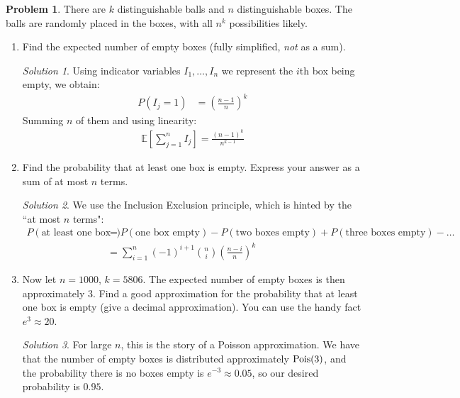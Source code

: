 \documentclass[11pt]{article}
\theoremstyle{definition}
\newtheorem{prob}[theo]{\color{Maroon} Problem}
\theoremstyle{remark}
\newtheorem*{soln}{\color{Maroon} Solution}
\newcommand{\E}[1]{\mathbb{E}\left[ #1 \right]}
\newcommand{\Pois}{\textnormal{Pois}}
\begin{document}
\pagebreak

\begin{prob} There are $k$ distinguishable balls and $n$ distinguishable boxes. The balls are randomly placed in the boxes, with all $n^k$ possibilities likely.

\begin{enumerate}[label = (\alph*)]
    \item Find the expected number of empty boxes (fully simplified, \textit{not} as a sum).
    
    \begin{soln} 
    Using indicator variables $I_1, \dots, I_n$ we represent the $i$th box being empty, we obtain:
    \begin{align*}
        P(I_j = 1) &= \left(\frac{n-1}{n}\right)^k
    \end{align*}
    Summing $n$ of them and using linearity:
    \begin{align*}
        \E{\sum_{j=1}^n I_j} = \frac{(n-1)^k}{n^{k-1}}
    \end{align*}
    \end{soln}
    
    \dotfill
    
    \item Find the probability that at least one box is empty. Express your answer as a sum of at most $n$ terms.
    
    \begin{soln} We use the Inclusion Exclusion principle, which is hinted by the ``at most $n$ terms":
    \begin{align*}
        P(\text{at least one box empty}) &= P(\text{one box empty}) - P(\text{two boxes empty}) + P(\text{three boxes empty}) - \dots \\
        &= \sum_{i=1}^n (-1)^{i+1}\binom{n}{i}\left(\frac{n-i}{n}\right)^k
    \end{align*}
    \end{soln}
    
    \dotfill
    
    \item Now let $n = 1000$, $k = 5806$. The expected number of empty boxes is then approximately $3$. Find a good approximation for the probability that at least one box is empty (give a decimal approximation). You can use the handy fact $e^3 \approx 20$.
    
    \begin{soln}
    For large $n$, this is the story of a Poisson approximation. We have that the number of empty boxes is distributed approximately $\Pois(3)$, and the probability there is no boxes empty is $e^{-3} \approx 0.05$, so our desired probability is $0.95$.
    \end{soln}
    
\end{enumerate}

\end{prob}
\end{document}
